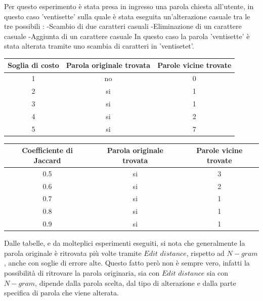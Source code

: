 \documentclass[a4paper,12pt]{article}
\begin{document}
Per questo esperimento è stata presa in ingresso una parola chiesta all'utente, in questo caso 'ventisette' sulla quale è stata eseguita un'alterazione casuale tra le tre possibili :
\newline
-Scambio di due caratteri casuali \newline
-Eliminazione di un carattere casuale \newline
-Aggiunta di un carattere casuale \newline
\newline
In questo caso la parola 'ventisette' è stata alterata tramite uno scambia di caratteri in 'ventisetet'.
\newline
\begin{center}
\vspace*{0.7cm}
\begin{tabular}{|c|c|c|}
\hline
\textbf{Soglia di costo}\bigstrut & \textbf{Parola originale trovata}  & \textbf{Parole vicine trovate} \\ \hline
 1\bigstrut & no & 0 \\\hline
 2\bigstrut & si & 1 \\\hline
 3\bigstrut & si & 1 \\\hline
 4\bigstrut & si & 2 \\\hline
 5\bigstrut & si & 7 \\\hline
\end{tabular}
\captionsetup{justification=centering,margin=1.05cm}
\end{center}

\begin{center}
\vspace*{0.7cm}
\begin{tabular}{|c|c|c|}
\hline
\textbf{Coefficiente di Jaccard}\bigstrut & \textbf{Parola originale trovata}  & \textbf{Parole vicine trovate} \\ \hline
 0.5\bigstrut & si & 3 \\\hline
 0.6\bigstrut & si & 2 \\\hline
 0.7\bigstrut & si & 1 \\\hline
 0.8\bigstrut & si & 1 \\\hline
 0.9\bigstrut & si & 1 \\\hline
\end{tabular}
\captionsetup{justification=centering,margin=1.05cm}
\end{center}
Dalle tabelle, e da molteplici esperimenti eseguiti, si nota che generalmente la parola originale è ritrovata più volte tramite $Edit$ $distance$, rispetto ad $N-gram$, anche con soglie di errore alte.
\newline
\newline
Questo fatto però non è sempre vero, infatti la possibilità di ritrovare la parola originaria, sia con $Edit$ $distance$ sia con $N-gram$, dipende dalla parola scelta, dal tipo di alterazione e dalla parte specifica di parola che viene alterata.
\clearpage
\end{document}
